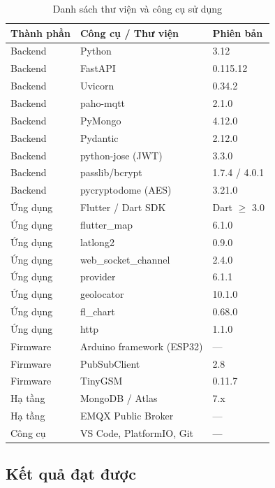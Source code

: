 \documentclass[../DoAn.tex]{subfiles}
\begin{document}
\begin{table}[H]
\centering
\caption{Danh sách thư viện và công cụ sử dụng}
\label{table:congcu}
\begin{tabular}{|l|l|l|}
\hline
\textbf{Thành phần} & \textbf{Công cụ / Thư viện} & \textbf{Phiên bản} \\ \hline
Backend & Python & 3.12 \\ \hline
Backend & FastAPI & 0.115.12 \\ \hline
Backend & Uvicorn & 0.34.2 \\ \hline
Backend & paho-mqtt & 2.1.0 \\ \hline
Backend & PyMongo & 4.12.0 \\ \hline
Backend & Pydantic & 2.12.0 \\ \hline
Backend & python-jose (JWT) & 3.3.0 \\ \hline
Backend & passlib/bcrypt & 1.7.4 / 4.0.1 \\ \hline
Backend & pycryptodome (AES) & 3.21.0 \\ \hline
Ứng dụng & Flutter / Dart SDK & Dart $\geq$ 3.0 \\ \hline
Ứng dụng & flutter\_map & 6.1.0 \\ \hline
Ứng dụng & latlong2 & 0.9.0 \\ \hline
Ứng dụng & web\_socket\_channel & 2.4.0 \\ \hline
Ứng dụng & provider & 6.1.1 \\ \hline
Ứng dụng & geolocator & 10.1.0 \\ \hline
Ứng dụng & fl\_chart & 0.68.0 \\ \hline
Ứng dụng & http & 1.1.0 \\ \hline
Firmware & Arduino framework (ESP32) & --- \\ \hline
Firmware & PubSubClient & 2.8 \\ \hline
Firmware & TinyGSM & 0.11.7 \\ \hline
Hạ tầng & MongoDB / Atlas & 7.x \\ \hline
Hạ tầng & EMQX Public Broker & --- \\ \hline
Công cụ & VS Code, PlatformIO, Git & --- \\ \hline
\end{tabular}
\end{table}

\subsection{Kết quả đạt được}
\end{document}
